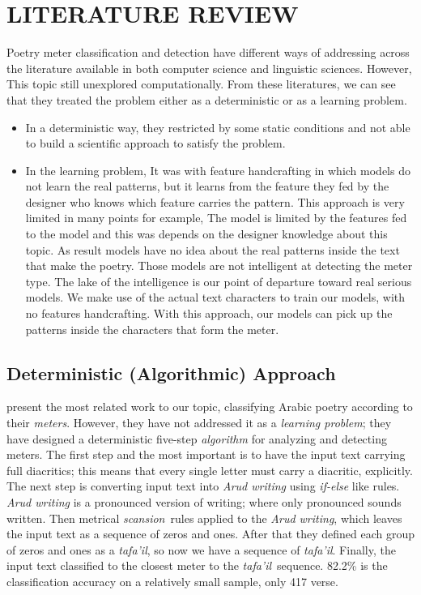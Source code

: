 \chapter{\uppercase{LITERATURE REVIEW}}\label{ch_literature}

Poetry meter classification and detection have different ways of addressing across the literature available in both computer science and linguistic sciences. However, This topic still unexplored computationally.
From these literatures, we can see that they treated the problem either as a deterministic or as a learning problem.

\begin{itemize}
  \item In a deterministic way, they restricted by some static conditions and not able to build a scientific approach to satisfy the problem.

\item In the learning problem, It was with feature handcrafting in which models do not learn the real patterns, but it learns from the feature they fed by the designer who knows which feature carries the pattern. This approach is very limited in many points for example, The model is limited by the features fed to the model and this was depends on the designer knowledge about this topic. As result models have no idea about the real patterns inside the text that make the poetry. Those models are not intelligent at detecting the meter type. The lake of the intelligence is our point of departure toward real serious models. We make use of the actual text characters to train our models, with no features handcrafting. With this approach, our models can pick up the patterns inside the characters that form the meter.

\end{itemize}
  
%
\section{Deterministic (Algorithmic) Approach}\label{sec:determ-algor-appr}

\cite{Abuata2016RuleBasedAlgorithmFor} present the most related work to our topic, classifying Arabic poetry according to their \textit{meters}. However, they have not addressed it as a \textit{learning problem}; they have designed a deterministic five-step \textit{algorithm} for analyzing and detecting meters. The first step and the most important is to have the input text carrying full diacritics; this means that every single letter must carry a diacritic, explicitly. The next step is converting input text into \textit{Arud writing} using \textit{if-else} like rules. \textit{Arud writing} is a pronounced version of writing; where only pronounced sounds written. Then metrical \textit{scansion} rules applied to the \textit{Arud writing}, which leaves the input text as a sequence of zeros and ones. After that they defined each group of zeros and ones as a \textit{tafa'il}, so now we have a sequence of \textit{tafa'il}. Finally, the input text classified to the closest meter to the \textit{tafa'il} sequence. 82.2\% is the classification accuracy on a relatively small sample, only 417 verse.

